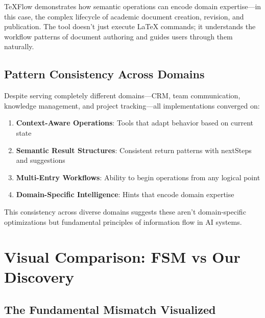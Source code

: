 \documentclass[11pt,a4paper]{article}
\begin{document}
TeXFlow demonstrates how semantic operations can encode domain expertise—in this case, the complex lifecycle of academic document creation, revision, and publication. The tool doesn't just execute LaTeX commands; it understands the workflow patterns of document authoring and guides users through them naturally.

\subsection{Pattern Consistency Across Domains}

Despite serving completely different domains—CRM, team communication, knowledge management, and project tracking—all implementations converged on:

\begin{enumerate}
\item \textbf{Context-Aware Operations}: Tools that adapt behavior based on current state
\item \textbf{Semantic Result Structures}: Consistent return patterns with nextSteps and suggestions
\item \textbf{Multi-Entry Workflows}: Ability to begin operations from any logical point
\item \textbf{Domain-Specific Intelligence}: Hints that encode domain expertise
\end{enumerate}

This consistency across diverse domains suggests these aren't domain-specific optimizations but fundamental principles of information flow in AI systems.

\section{Visual Comparison: FSM vs Our Discovery}

\subsection{The Fundamental Mismatch Visualized}
\end{document}
